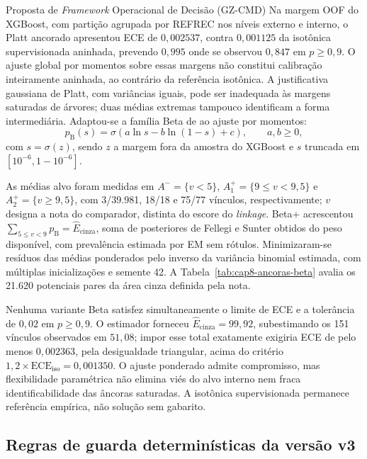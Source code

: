 \begin{chapter}{Proposta de \textit{Framework} Operacional de Decisão (GZ-CMD)}
Na margem OOF do XGBoost, com partição agrupada por REFREC nos níveis externo e interno, o Platt ancorado apresentou ECE de $0{,}002537$, contra $0{,}001125$ da isotônica supervisionada aninhada, prevendo $0{,}995$ onde se observou $0{,}847$ em $p\geq0{,}9$. O ajuste global por momentos sobre essas margens não constitui calibração inteiramente aninhada, ao contrário da referência isotônica. A justificativa gaussiana de Platt, com variâncias iguais, pode ser inadequada às margens saturadas de árvores; duas médias extremas tampouco identificam a forma intermediária. Adaptou-se a família Beta de  ao ajuste por momentos:
\begin{equation}
p_{\mathrm{B}}(s)=\sigma\!\left(a\ln s-b\ln(1-s)+c\right),
\qquad a,b\geq0,
\label{eq:cap8-beta-momentos}
\end{equation}
com $s=\sigma(z)$, sendo $z$ a margem fora da amostra do XGBoost e $s$ truncada em $[10^{-6},1-10^{-6}]$.

As médias alvo foram medidas em $A^- = \{v<5\}$, $A^+_1=\{9\leq v<9{,}5\}$ e $A^+_2=\{v\geq9{,}5\}$, com 3/39.981, 18/18 e 75/77 vínculos, respectivamente; $v$ designa a nota do comparador, distinta do escore do \textit{linkage}. Beta+ acrescentou $\sum_{5\leq v<9}p_{\mathrm{B}}=\widehat{E}_{\mathrm{cinza}}$, soma de posteriores de Fellegi e Sunter obtidos do peso disponível, com prevalência estimada por EM sem rótulos. Minimizaram-se resíduos das médias ponderados pelo inverso da variância binomial estimada, com múltiplas inicializações e semente 42. A Tabela~\ref{tab:cap8-ancoras-beta} avalia os 21.620 potenciais pares da área cinza definida pela nota.



Nenhuma variante Beta satisfez simultaneamente o limite de ECE e a tolerância de $0{,}02$ em $p\geq0{,}9$. O estimador forneceu $\widehat{E}_{\mathrm{cinza}}=99{,}92$, subestimando os 151 vínculos observados em $51{,}08$; impor esse total exatamente exigiria ECE de pelo menos $0{,}002363$, pela desigualdade triangular, acima do critério $1{,}2\times\mathrm{ECE}_{\mathrm{iso}}=0{,}001350$. O ajuste ponderado admite compromisso, mas flexibilidade paramétrica não elimina viés do alvo interno nem fraca identificabilidade das âncoras saturadas. A isotônica supervisionada permanece referência empírica, não solução sem gabarito.

\subsection{Regras de guarda determinísticas da versão v3}
\label{sec:cap8-regras-guarda}


\end{chapter}
